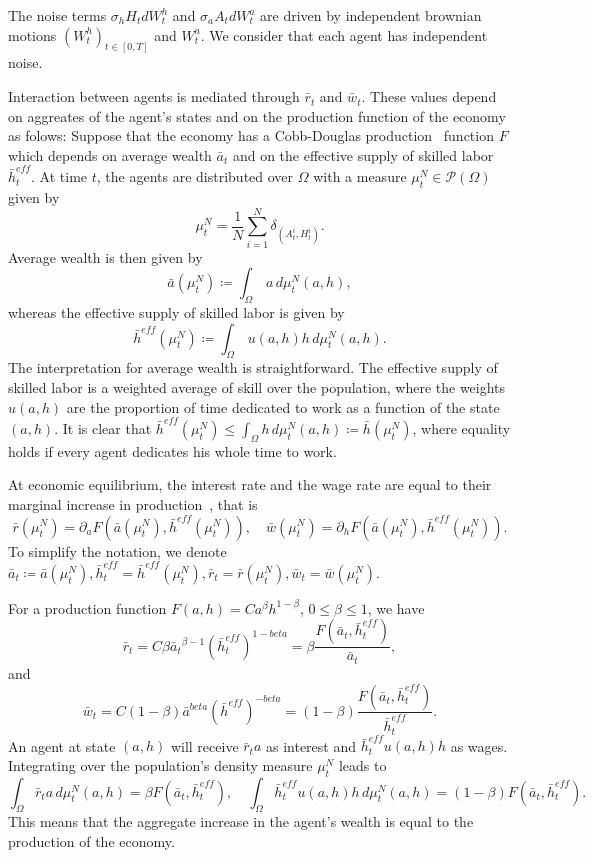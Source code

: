 The noise terms $\sigma_h H_t dW^h_t$ and $\sigma_a A_t dW^a_t$ are driven by independent brownian motions ${(W^h_t)}_{t \in [0,T]}$ and $W^a_t$.
We consider that each agent has independent noise.

Interaction between agents is mediated through $\bar r_t$ and $\bar w_t$.
These values depend on aggreates of the agent's states and on the production function of the economy as folows:
Suppose that the economy has a Cobb-Douglas production~\cite{find a citation for cobb douglas} function $F$ which depends on average wealth $\bar a_t$ 
and on the effective supply of skilled labor $\bar h_t^{eff}$.
At time $t$, the agents are distributed over $\Omega$ with a measure $\mu^N_t \in \mathcal{P}(\Omega)$ given by
\[
\mu^N_t = \frac{1}{N} \sum_{i = 1}^N \delta_{(A^i_t, H^i_t)}.
\]
Average wealth is then given by
\[
\bar a(\mu^N_t) \coloneqq \int_\Omega \, a \, d\mu^N_t (a,h),
\]
whereas the effective supply of skilled labor is given by
\[
\bar h^{eff}(\mu^N_t) \coloneqq \int_\Omega \, u(a,h) h \, d\mu^N_t (a,h).
\]
The interpretation for average wealth is straightforward.
The effective supply of skilled labor is a weighted average of skill over the population, where the weights $u(a,h)$ are the proportion of time dedicated to work as a function of the state $(a,h)$.
It is clear that $\bar h^{eff}(\mu^N_t) \leq \int_\Omega  h \, d\mu^N_t (a,h) \coloneqq \bar h(\mu^N_t)$, where equality holds if every agent dedicates his whole time to work.

At economic equilibrium, the interest rate and the wage rate are equal to their marginal increase in production~\cite{find a citation for this}, that is
\[
\bar r(\mu^N_t)= \partial_a F(\bar a(\mu^N_t), \bar h^{eff}(\mu^N_t)), \quad \bar w(\mu^N_t)= \partial_h F(\bar a(\mu^N_t), \bar h^{eff}(\mu^N_t)).
\]
To simplify the notation, we denote
$\bar a_t \coloneqq \bar a(\mu^N_t), \bar h^{eff}_t = \bar h^{eff}(\mu^N_t), \bar r_t = \bar r(\mu^N_t), \bar w_t = \bar w(\mu^N_t)$.


For a production function $F(a,h) = C a^\beta h^{1 - \beta}$, $0 \leq \beta \leq 1$, we have
\[
\bar r_t = C \beta {\bar a_t}^{\beta - 1} {({\bar h}^{eff}_t)}^{1 - beta} = \beta \frac{F(\bar a_t, \bar h^{eff}_t)}{\bar a_t},
\]
and
\[
\bar w_t = C (1 - \beta) {\bar a}^{beta} {({\bar h^{eff}})}^{ - beta} = (1 - \beta) \frac{F (\bar a_t, \bar h^{eff}_t)}{\bar h^{eff}_t}.
\]
An agent at state $(a,h)$ will receive $\bar r_t a$ as interest and $\bar h^{eff}_t u(a,h) h$ as wages.
Integrating over the population's density measure $\mu^N_t$ leads to
\[
    \int_\Omega \bar r_t a \, d\mu^N_t(a,h) = \beta F(\bar a_t, \bar h^{eff}_t),\quad \int_\Omega \bar h^{eff}_t u(a,h) h \, d\mu^N_t(a,h) = (1 - \beta) F(\bar a_t, \bar h^{eff}_t).    
\]
This means that the aggregate increase in the agent's wealth is equal to the production of the economy.

